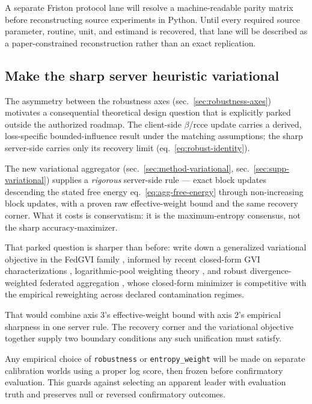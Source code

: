 \documentclass[
  english,
]{article}
\theoremstyle{plain}
\theoremstyle{definition}
\theoremstyle{remark}
\theoremstyle{definition}
\begin{document}
A separate Friston protocol lane will resolve a machine-readable parity
matrix before reconstructing source experiments in Python. Until every
required source parameter, routine, unit, and estimand is recovered,
that lane will be described as a paper-constrained reconstruction rather
than an exact replication.

\subsection{Make the sharp server heuristic
variational}\label{sec:future-server}

The asymmetry between the robustness axes
(sec.~\ref{sec:robustness-axes}) motivates a consequential theoretical
design question that is explicitly parked outside the authorized
roadmap. The client-side \(\beta\)/rcce update carries a derived,
loss-specific bounded-influence result under the matching assumptions;
the sharp server-side  carries only its
recovery limit (eq.~\ref{eq:robust-identity}).

The new variational aggregator (sec.~\ref{sec:method-variational},
sec.~\ref{sec:supp-variational}) supplies a \emph{rigorous} server-side
rule --- exact block updates descending the stated free energy
eq.~\ref{eq:agg-free-energy} through non-increasing block updates, with
a proven raw effective-weight bound and the same recovery corner. What
it costs is conservatism: it is the maximum-entropy consensus, not the
sharp accuracy-maximizer.

That parked question is sharper than before: write down a generalized
variational objective in the FedGVI family \citep{mildner2025fedgvi},
informed by recent closed-form GVI characterizations
\citep{nguyen2026closedformgvi}, logarithmic-pool weighting theory
\citep{carvalho2023logpooling}, and robust divergence-weighted federated
aggregation \citep{li2022gammafl}, whose closed-form minimizer is
competitive with the empirical reweighting across declared contamination
regimes.

That would combine axis 3's effective-weight bound with axis 2's
empirical sharpness in one server rule. The recovery corner and the
variational objective together supply two boundary conditions any such
unification must satisfy.

Any empirical choice of \texttt{robustness} or \texttt{entropy\_weight}
will be made on separate calibration worlds using a proper log score,
then frozen before confirmatory evaluation. This guards against
selecting an apparent leader with evaluation truth and preserves null or
reversed confirmatory outcomes.
\end{document}
